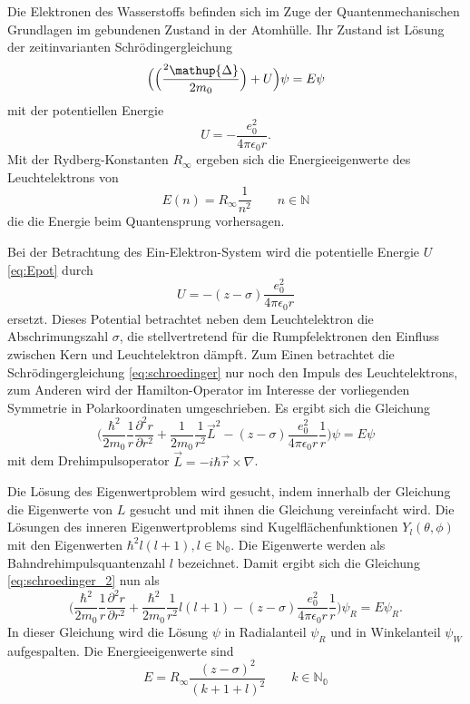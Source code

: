 Die Elektronen des Wasserstoffs befinden sich im Zuge der Quantenmechanischen Grundlagen im gebundenen Zustand in der Atomhülle.
Ihr Zustand ist Lösung der zeitinvarianten Schrödingergleichung
\begin{equation}
	\Bigl(\Bigl(\frac{\hbar^2\mathup{\Delta}}{2 m_0}\Bigr)+U\Bigr)\psi=E\psi
	\label{eq:schroedinger}
\end{equation}
mit der potentiellen Energie 
\begin{equation}
	U=-\frac{e_0^2}{4\pi\epsilon_0 r}.
	\label{eq:Epot}
\end{equation}
Mit der Rydberg-Konstanten $R_\infty$ ergeben sich die Energieeigenwerte des Leuchtelektrons von
\begin{equation}
	E(n)=R_\infty\frac{1}{n^2} \qquad n\in\mathbb{N}
	\label{eq:EEW}
\end{equation}
die die Energie beim Quantensprung vorhersagen.

Bei der Betrachtung des Ein-Elektron-System wird die potentielle Energie $U$ \eqref{eq:Epot} durch
\begin{equation}
	U=-(z-\sigma)\frac{e_0^2}{4\pi\epsilon_0 r}
	\label{eq:Epot_neu}
\end{equation}
ersetzt.
Dieses Potential betrachtet neben dem Leuchtelektron die Abschrimungszahl $\sigma$, die stellvertretend für die Rumpfelektronen den Einfluss zwischen Kern und Leuchtelektron dämpft.
Zum Einen betrachtet die Schrödingergleichung \eqref{eq:schroedinger} nur noch den Impuls des Leuchtelektrons, zum Anderen wird der Hamilton-Operator im Interesse der vorliegenden Symmetrie in Polarkoordinaten umgeschrieben.
Es ergibt sich die Gleichung
\begin{equation}
	\biggl(\frac{\hbar^2}{2m_0}\frac{1}{r}\frac{\partial^2 r}{\partial r^2}+\frac{1}{2m_0}\frac{1}{r^2} \vec{L}^2-(z-\sigma)\frac{e_0^2}{4\pi\epsilon_0 r}\frac{1}{r}\biggr)\psi=E\psi
	\label{eq:schroedinger_2}
\end{equation}
mit dem Drehimpulsoperator $\vec{L}=-i\hbar\vec{r}\times\nabla$.

Die Lösung des Eigenwertproblem wird gesucht, indem innerhalb der Gleichung die Eigenwerte von $L$ gesucht und mit ihnen die Gleichung vereinfacht wird.
Die Lösungen des inneren Eigenwertproblems sind Kugelflächenfunktionen $Y_l(\theta,\phi)$ mit den Eigenwerten $\hbar^2 l(l+1), l\in\mathbb{N_0}$.
Die Eigenwerte werden als Bahndrehimpulsquantenzahl $l$ bezeichnet.
Damit ergibt sich die Gleichung \eqref{eq:schroedinger_2} nun als
\begin{equation}
	\biggl(\frac{\hbar^2}{2m_0}\frac{1}{r}\frac{\partial^2 r}{\partial r^2}+\frac{\hbar^2}{2m_0}\frac{1}{r^2} l(l+1)-(z-\sigma)\frac{e_0^2}{4\pi\epsilon_0 r}\frac{1}{r}\biggr)\psi_R=E\psi_R.
	\label{eq:EEW_drehimpuls_flasche}
\end{equation}
In dieser Gleichung wird die Lösung $\psi$ in Radialanteil $\psi_R$ und in Winkelanteil $\psi_W$ aufgespalten. 
Die Energieeigenwerte sind
\begin{equation}
	E=R_\infty\frac{(z-\sigma)^2}{(k+1+l)^2} \qquad k\in\mathbb{N_0}
	\label{eq:EEW_drehimpuls}
\end{equation}

